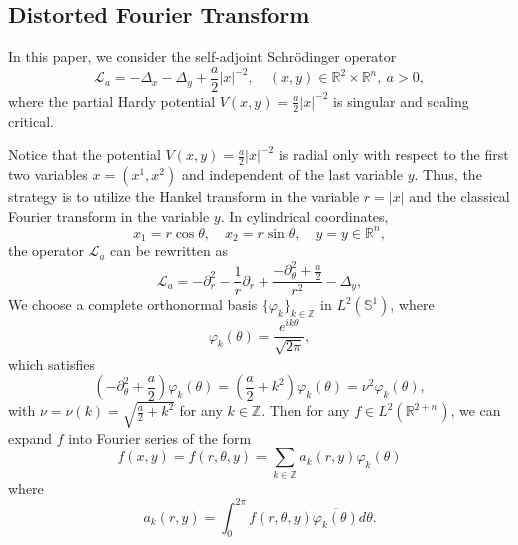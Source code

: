 \documentclass[a4paper,11pt, reqno]{amsart}
\numberwithin{equation}{section}
\theoremstyle{plain}
\theoremstyle{definition}
\theoremstyle{remark}
\begin{document}
\subsection{Distorted Fourier Transform}
In this paper, we consider the self-adjoint Schrödinger operator
\begin{equation}\label{6.2}
\mathcal{L}_a=-\Delta_x - \Delta_y + \frac{a}{2} |x|^{-2}, \quad (x,y) \in \mathbb{R}^2 \times \mathbb{R}^n, \:a > 0,  
\end{equation}
where the partial Hardy potential $V(x, y) = \frac{a}{2} |x|^{-2}$ is singular and scaling critical. 

Notice that the potential $V(x, y) = \frac{a}{2} |x|^{-2}$ is radial only with respect to the first two variables $x = (x^1, x^2)$ and independent of the last variable $y$. Thus, the strategy is to utilize the Hankel transform in the variable $r=|x|$ and the classical Fourier transform in the variable $y$. In cylindrical coordinates,
\begin{equation*}
		x_1 = r \cos\theta, \quad x_2 = r \sin\theta, \quad y = y \in \mathbb{R}^n,
\end{equation*}
the operator $\mathcal{L}_a$ can be rewritten as
\begin{equation*}
\mathcal{L}_a=-\partial _{r}^{2}-\frac{1}{r}\partial _r+\frac{-\partial _{\theta}^{2}+\frac{a}{2}}{r^2}-\Delta_y,
\end{equation*}
We choose a complete orthonormal basis $\{\varphi_k\}_{k\in\mathbb{Z}}$ in  $L^2(\mathbb{S}^1)$, where 
\begin{equation*}
\varphi_k(\theta) = \frac{e^{ik\theta}}{\sqrt{2\pi}},
\end{equation*}
which satisfies
\begin{equation*}
\left(-\partial_\theta^2 + \frac{a}{2}\right)\varphi_k(\theta) = \left(\frac{a}{2} + k^2\right)\varphi_k(\theta)=\nu^2 \varphi_k(\theta),
\end{equation*}
with $\nu = \nu(k)= \sqrt{\frac{a}{2} + k^2}$ for any $k \in \mathbb{Z}$. Then for any $f\in L^2(\mathbb{R}^{2+n})$, we can expand $f$ into Fourier series of the form
\begin{equation*}
f(x,y) =f( r,\theta ,y)=\sum_{k\in\mathbb{Z}}a_k( r,y)\varphi_k(\theta) 
\end{equation*}
where 
\begin{equation*}
a_k(r,y)=\int_0^{2\pi}f( r,\theta ,y) \overline{\varphi _k(\theta) }d\theta.
\end{equation*}
\end{document}
